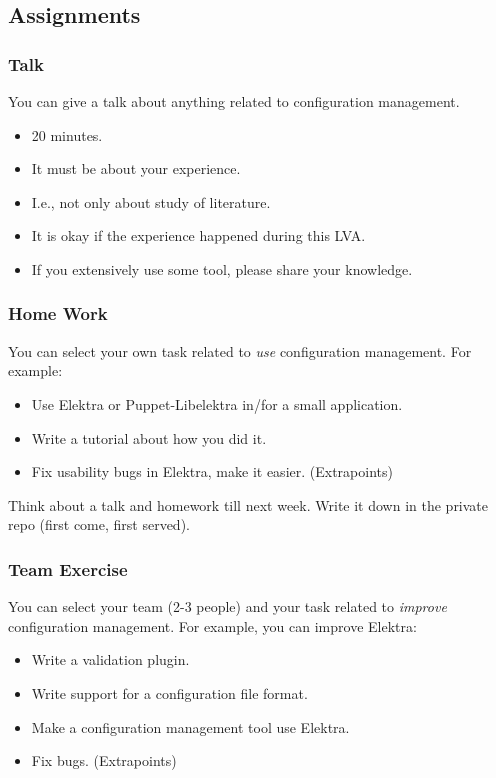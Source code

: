 \subsection{Assignments}
\begin{frame}
	\frametitle{Talk}
	You can give a talk about anything related to configuration management.
	\begin{itemize}
		\item 20 minutes.
		\item It must be about your experience.
		\item I.e., not only about study of literature.
		\item It is okay if the experience happened during this LVA.
		\item If you extensively use some tool, please share your knowledge.
	\end{itemize}
\end{frame}

\begin{frame}
	\frametitle{Home Work}
	You can select your own task related to \emph{use} configuration management.
	For example:
	\begin{itemize}
		\item Use Elektra or Puppet-Libelektra in/for a small application.
		\item Write a tutorial about how you did it.
		\item Fix usability bugs in Elektra, make it easier. (Extrapoints)
	\end{itemize}
\end{frame}

\begin{assignment}
	\begin{task}
	Think about a talk and homework till next week.
	Write it down in the private repo (first come, first served).
	\end{task}
\end{assignment}

\begin{frame}
	\frametitle{Team Exercise}
	You can select your team (2-3 people) and your task related to \emph{improve} configuration management.
	For example, you can improve Elektra:
	\begin{itemize}
		\item Write a validation plugin.
		\item Write support for a configuration file format.
		\item Make a configuration management tool use Elektra.
		\item Fix bugs. (Extrapoints)
	\end{itemize}
\end{frame}

